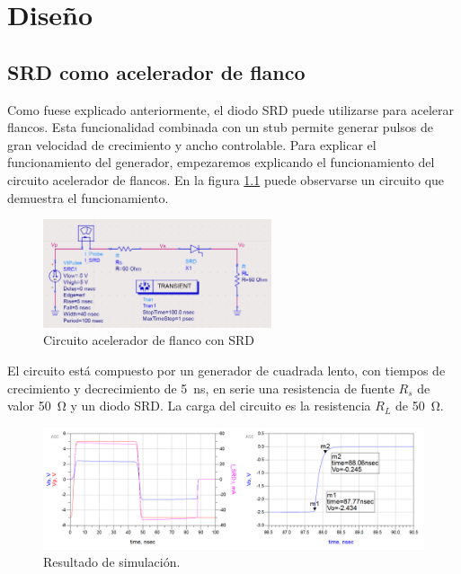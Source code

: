 \chapter{Diseño}

\section{SRD como acelerador de flanco}
\label{sec:srd_sharpener}

Como fuese explicado anteriormente, el diodo SRD puede utilizarse para acelerar
flancos. Esta funcionalidad combinada con un stub permite generar pulsos de gran
velocidad de crecimiento y ancho controlable. Para explicar el funcionamiento
del generador, empezaremos explicando el funcionamiento del circuito acelerador
de flancos. En la figura \ref{fig:srd_sharpener} puede observarse un circuito que demuestra
el funcionamiento.

\begin{figure}
  \centering
    \includegraphics[width=0.6\textwidth]{images/srd_sharpener_circuit.png}
    \caption{Circuito acelerador de flanco con SRD}
    \label{fig:srd_sharpener}
\end{figure}

El circuito está compuesto por un generador de cuadrada lento, con tiempos de
crecimiento y decrecimiento de \qty{5}{\nano\second}, en serie una resistencia
de fuente $R_s$ de valor \qty{50}{\ohm} y un diodo SRD. La carga del circuito es
la resistencia $R_L$ de \qty{50}{\ohm}.

\begin{figure}[tbp]
    \centering
    \includegraphics[width=\textwidth]{images/srd_sharpener_result.png}
    \caption{Resultado de simulación.}
    \label{fig:srd_sharpener_result}
\end{figure}

